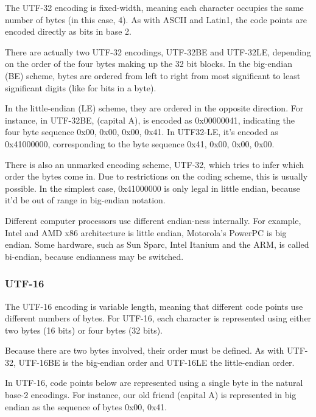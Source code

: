 The UTF-32 encoding is fixed-width, meaning each character occupies
the same number of bytes (in this case, 4).  As with ASCII and
Latin1, the code points are encoded directly as bits in base 2.

There are actually two UTF-32 encodings, UTF-32BE and UTF-32LE,
depending on the order of the four bytes making up the 32 bit blocks.
In the big-endian (BE) scheme, bytes are ordered from left to right
from most significant to least significant digits (like for bits in a
byte).  

In the little-endian (LE) scheme, they are ordered in the
opposite direction.  For instance, in UTF-32BE, 
(capital A), is encoded as 0x00000041, indicating the four byte
sequence 0x00, 0x00, 0x00, 0x41.  In UTF32-LE, it's encoded as
0x41000000, corresponding to the byte sequence 0x41, 0x00, 0x00, 0x00.

There is also an unmarked encoding scheme, UTF-32, which tries to
infer which order the bytes come in.  Due to restrictions on the
coding scheme, this is usually possible.  In the simplest case,
0x41000000 is only legal in little endian, because it'd be out of
range in big-endian notation.  

Different computer processors use different endian-ness
internally.  For example, Intel and AMD x86 architecture is little
endian, Motorola's PowerPC is big endian.  Some hardware, such
as Sun Sparc, Intel Itanium and the ARM, is called bi-endian, because
endianness may be switched.

\subsubsection{UTF-16}

The UTF-16 encoding is variable length, meaning that different code
points use different numbers of bytes.  For UTF-16, each character is
represented using either two bytes (16 bits) or four bytes (32 bits).

Because there are two bytes involved, their order must be defined.  As
with UTF-32, UTF-16BE is the big-endian order and UTF-16LE the
little-endian order.

In UTF-16, code points below  are represented using a
single byte in the natural base-2 encodings.  For instance, our old
friend  (capital A) is represented in big endian as
the sequence of bytes 0x00, 0x41.  

